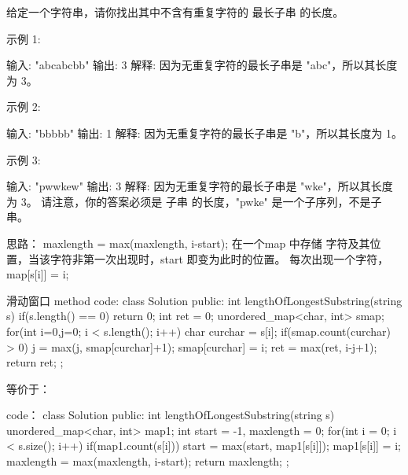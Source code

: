 给定一个字符串，请你找出其中不含有重复字符的 最长子串 的长度。

示例 1:

输入: "abcabcbb"
输出: 3 
解释: 因为无重复字符的最长子串是 "abc"，所以其长度为 3。

示例 2:

输入: "bbbbb"
输出: 1
解释: 因为无重复字符的最长子串是 "b"，所以其长度为 1。

示例 3:

输入: "pwwkew"
输出: 3
解释: 因为无重复字符的最长子串是 "wke"，所以其长度为 3。
     请注意，你的答案必须是 子串 的长度，"pwke" 是一个子序列，不是子串。
































思路：
maxlength = max(maxlength, i-start);
在一个map 中存储 字符及其位置，当该字符非第一次出现时，start 即变为此时的位置。
每次出现一个字符，map[s[i]] = i;




















滑动窗口 method
code:
class Solution {
public:
    int lengthOfLongestSubstring(string s) {
        if(s.length() == 0) return 0;
        int ret = 0;
        unordered_map<char, int> smap;
        for(int i=0,j=0; i < s.length(); i++)
        {
            char curchar = s[i];
            if(smap.count(curchar) > 0) j = max(j, smap[curchar]+1);
            smap[curchar] = i;
            ret = max(ret, i-j+1);
        }
        return ret;
    }
};

等价于：


code：
class Solution {
public:
    int lengthOfLongestSubstring(string s) {
        unordered_map<char, int> map1;
        int start = -1, maxlength = 0;
        for(int i = 0; i < s.size(); i++)
        {
            if(map1.count(s[i]))
                start = max(start, map1[s[i]]);
            map1[s[i]] = i;
            maxlength = max(maxlength, i-start);
        }
        return maxlength;
    }
};